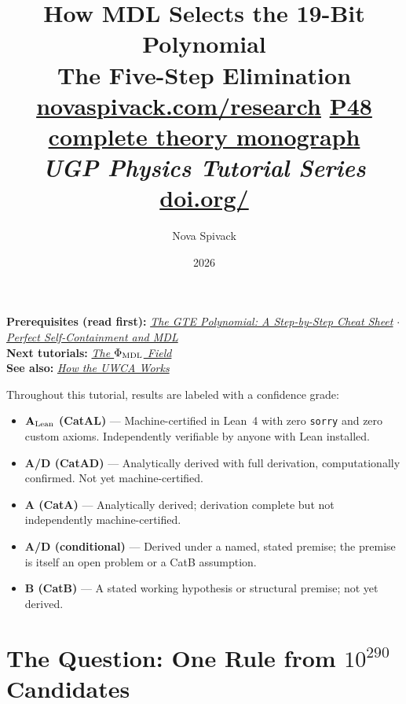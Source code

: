 \documentclass[11pt,a4paper]{article}
\title{\textbf{How MDL Selects the 19-Bit Polynomial}\\[6pt]
\large The Five-Step Elimination\\[8pt]
\normalsize
\href{https://novaspivack.com/research}{novaspivack.com/research}\quad
\href{https://doi.org/10.5281/zenodo.20560550}{P48 complete theory monograph}\\[4pt]\normalsize\textit{UGP Physics Tutorial Series}
\\[2pt]\small\href{https://doi.org/\TutorialDOI}{doi.org/\TutorialDOI}}
\author{Nova Spivack}
\date{2026}
\theoremstyle{definition}
\begin{document}
\setcounter{tocdepth}{2}
\maketitle
\tableofcontents
\newpage

\begin{tcolorbox}[colback=blue!6,colframe=blue!40!black,
  title=\textbf{UGP Physics Tutorial Series}]
\textbf{Prerequisites (read first):} \href{https://doi.org/10.5281/zenodo.20657889}{\emph{The GTE Polynomial: A Step-by-Step Cheat Sheet}} $\cdot$ \href{https://doi.org/10.5281/zenodo.20657895}{\emph{Perfect Self-Containment and MDL}}\\[4pt]
\textbf{Next tutorials:} \href{https://doi.org/10.5281/zenodo.20657885}{\emph{The $\Phi_{\rm MDL}$ Field}}\\[4pt]
\textbf{See also:} \href{https://doi.org/10.5281/zenodo.20657919}{\emph{How the UWCA Works}}
\end{tcolorbox}

\begin{tcolorbox}[colback=boxgreen,colframe=green!50!black,
  title=\textbf{Claim-Strength Taxonomy}]
Throughout this tutorial, results are labeled with a confidence grade:
\begin{itemize}[itemsep=2pt]
  \item \textbf{$\mathbf{A}_{\rm Lean}$ (CatAL)} --- Machine-certified in Lean~4 with zero \texttt{sorry} and zero custom axioms.  Independently verifiable by anyone with Lean installed.
  \item \textbf{A/D (CatAD)} --- Analytically derived with full derivation, computationally confirmed.  Not yet machine-certified.
  \item \textbf{A (CatA)} --- Analytically derived; derivation complete but not independently machine-certified.
  \item \textbf{A/D (conditional)} --- Derived under a named, stated premise; the premise is itself an open problem or a CatB assumption.
  \item \textbf{B (CatB)} --- A stated working hypothesis or structural premise; not yet derived.
\end{itemize}
\end{tcolorbox}


\section{The Question: One Rule from $10^{290}$ Candidates}
\end{document}

